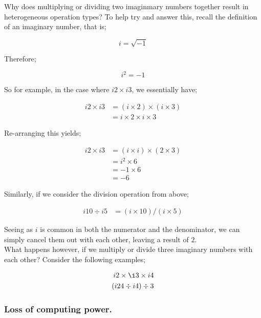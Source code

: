 \documentclass{article}
\begin{document}
Why does multiplying or dividing two imaginmary numbers together result in heterogeneous operation types?
To help try and answer this, recall the definition of an imaginary number, that is;

\begin{equation*}
i = \sqrt{-1}
\end{equation*}

Therefore;

\begin{equation*}
i^{2} = -1
\end{equation*}

So for example, in the case where $i2 \times i3$, we essentially have;

\begin{align*}
i2 \times i3 &= (i \times 2) \times (i \times 3) \\
             &= i \times 2 \times i \times 3
\end{align*}

Re-arranging this yields;

\begin{align*}
i2 \times i3 &= (i \times i) \times (2 \times 3) \\
             &= i^{2} \times 6 \\
             &= -1 \times 6 \\
             &= -6
\end{align*}

Similarly, if we consider the division operation from above;

\begin{align*}
i10 \div i5 &= (i \times 10) / (i \times 5)
\end{align*}

Seeing as $i$ is common in both the numerator and the denominator, we can simply cancel them out with each other,
leaving a result of $2$.\\

What happens however, if we multiply or divide three imaginary numbers with each other? Consider the following
examples;

\begin{align*}
i2 \times \i3 \times i4 \\
(i24 \div i4) \div 3 
\end{align*}


\subsubsection{Loss of computing power.}
\end{document}
